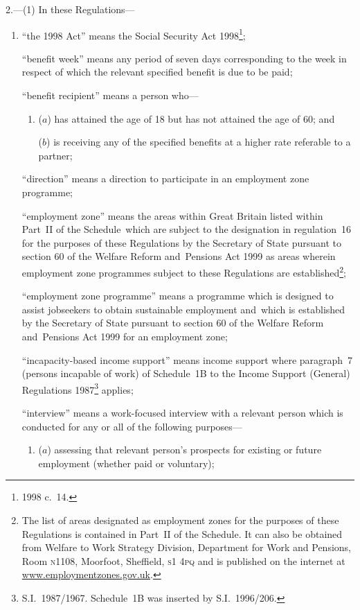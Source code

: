 \documentclass[12pt,a4paper]{article}
\begin{document}
2.---(1)  In these Regulations—
\begin{enumerate}\item[]
“the 1998 Act” means the Social Security Act 1998\footnote{1998 c.~14.};

“benefit week” means any period of seven days corresponding to the week in respect of which the relevant specified benefit is due to be paid;

“benefit recipient” means a person who—
\begin{enumerate}\item[]
($a$) 
has attained the age of 18 but has not attained the age of 60; and

($b$) 
is receiving any of the specified benefits at a higher rate referable to a partner;
\end{enumerate}

“direction” means a direction to participate in an employment zone programme;

\newcommand\postcode[1]{\textsc{\lowercase{#1}}}

“employment zone” means the areas within Great Britain listed within Part~II of the Schedule~which are subject to the designation in regulation~16 for the purposes of these Regulations by the Secretary of State pursuant to section 60 of the Welfare Reform and~Pensions Act 1999 as areas wherein employment zone programmes subject to these Regulations are established\footnote{The list of areas designated as employment zones for the purposes of these Regulations is contained in Part~II of the Schedule. It can also be obtained from Welfare to Work Strategy Division, Department for Work and Pensions, Room \postcode{N1108}, Moorfoot, Sheffield, \postcode{S1 4PQ} and is published on the internet at \url{www.employmentzones.gov.uk}.};

“employment zone programme” means a programme which is designed to assist jobseekers to obtain sustainable employment and~which is established by the Secretary of State pursuant to section 60 of the Welfare Reform and~Pensions Act 1999 for an employment zone;

“incapacity-based income support” means income support where paragraph~7 (persons incapable of work) of Schedule~1B to the Income Support (General) Regulations 1987\footnote{S.I.~1987/1967. Schedule~1B was inserted by S.I.~1996/206.} applies;

“interview” means a work-focused interview with a relevant person which is conducted for any or all of the following purposes—
\begin{enumerate}\item[]
($a$) 
assessing that relevant person’s prospects for existing or future employment (whether paid or voluntary);


\end{enumerate}
\end{enumerate}
\end{document}
